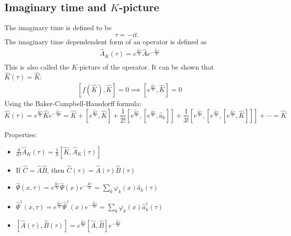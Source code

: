 \documentclass[11pt, a4paper]{article}
\newcommand{\dd}{\mathrm{d}}
\begin{document}
\subsection{Imaginary time and $K$-picture}
The imaginary time is defined to be
\begin{equation*}
    \tau = -it.
\end{equation*}
The imaginary time dependendent form of an operator is defined as 
\begin{align*}
    &\hat A_K(\tau) = e^{\frac{\hat K\tau}{\hbar}}\hat Ae^{-\frac{\hat K\tau}{\hbar}} \\
\end{align*}
This is also called the $K$-picture of the operator. It can be shown that $\hat K(\tau) = \hat K$:
\begin{align*}
    & \left[f(\hat K), \hat K \right] = 0 \implies \left[e^{\frac{\hat K\tau}{\hbar}}, \hat K\right] = 0
\end{align*}
Using the Baker-Campbell-Hausdorff formula:
\begin{equation*}
    \hat K(\tau) = e^{\frac{\hat K\tau}{\hbar}}\hat K e^{-\frac{\hat K\tau}{\hbar}} = \hat K + [e^{\frac{\hat K\tau}{\hbar}}, \hat K] 
    + \frac{1}{2!}[e^{\frac{\hat K\tau}{\hbar}}, [e^{\frac{\hat K\tau}{\hbar}},\hat a_k]]
    + \frac{1}{3!}[e^{\frac{\hat K\tau}{\hbar}}, [e^{\frac{\hat K\tau}{\hbar}}, [e^{\frac{\hat K\tau}{\hbar}},\hat K]]]
    + \cdots = \hat K
\end{equation*}

Properties:
\begin{itemize}
    \item $\displaystyle{\frac{\dd}{\dd\tau} \hat A_K(\tau) = \frac{1}{\hbar}[\hat K, \hat A_K(\tau)] }$
    \item If $\hat C = \hat A\hat B$, then $\hat C(\tau) = \hat A(\tau)\hat B(\tau)$
    \item $\displaystyle{\hat \Psi(x, \tau) = e^{\frac{\hat K\tau}{\hbar}}\hat\Psi(x)e^{-\frac{\hat K\tau}{\hbar}} = \sum\limits_k \varphi_k(x)\hat a_k(\tau)}$
    \item $\displaystyle{\hat \Psi^{\dagger}(x, \tau) = e^{\frac{\hat K\tau}{\hbar}}\hat\Psi^{\dagger}(x)e^{-\frac{\hat K\tau}{\hbar}} = \sum\limits_k \varphi_k(x)\hat a_k^{\dagger}(\tau)}$
    \item $[\hat A(\tau), \hat B(\tau)] = e^{\frac{\hat K\tau}{\hbar}}[\hat A, \hat B]e^{-\frac{\hat K\tau}{\hbar}}$
\end{itemize}
\end{document}
